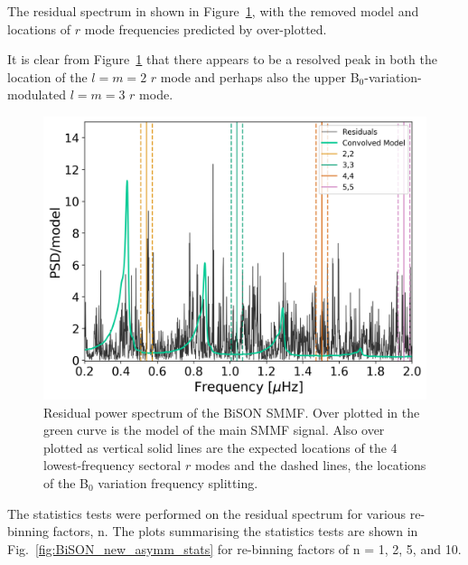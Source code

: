 The residual spectrum in shown in Figure~\ref{fig:residuals}, with the removed model and locations of $r$ mode frequencies predicted by \citet{lanza_sectoral_2019} over-plotted.

It is clear from Figure~\ref{fig:residuals} that there appears to be a resolved peak in both the location of the $l=m=2$ $r$ mode and perhaps also the upper B$_0$-variation-modulated $l=m=3$ $r$ mode.

\begin{figure}[!ht]
	\centering
	\includegraphics[width=0.65\columnwidth]{asymm_div_r-modes_obs.png} 
	\caption{Residual power spectrum of the BiSON SMMF. Over plotted in the green curve is the model of the main SMMF signal. Also over plotted as vertical solid lines are the expected locations of the 4 lowest-frequency sectoral $r$ modes and the dashed lines, the locations of the B$_0$ variation frequency splitting.}  \label{fig:residuals}
\end{figure}

The statistics tests were performed on the residual spectrum for various re-binning factors, n. The plots summarising the statistics tests are shown in Fig.~\ref{fig:BiSON_new_asymm_stats} for re-binning factors of n = 1, 2, 5, and 10.

